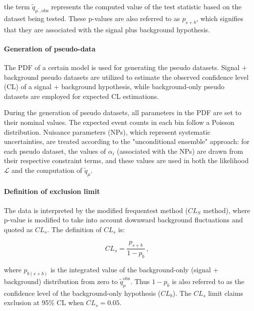 \noindent
the term $\tilde{q}_{\mu^\prime,\mathrm{obs}}$ represents the computed value of the test statistic based on the dataset being tested. These p-values are also referred to as $p_{s+b}$, which signifies that they are associated with the signal plus background hypothesis.

\paragraph{Generation of pseudo-data}\mbox{}\par

The PDF of a certain model is used for generating the pseudo datasets. Signal + background pseudo datasets are utilized to estimate the observed confidence level (CL) of a signal + background hypothesis, while background-only pseudo datasets are employed for expected CL estimations.

During the generation of pseudo datasets, all parameters in the PDF are set to their nominal values. The expected event counts in each bin follow a Poisson distribution. Nuisance parameters (NPs), which represent systematic uncertainties, are treated according to the "unconditional ensemble" approach: for each pseudo dataset, the values of $\alpha_i$ (associated with the NPs) are drawn from their respective constraint terms, and these values are used in both the likelihood $\mathcal{L}$ and the computation of $\tilde{q}_\mu$.




\paragraph{Definition of exclusion limit}\mbox{}\par

The data is interpreted by the modified frequentest method ($CL_S$ method), where p-value is modified to take into account
downward background fluctuations and quoted as
$CL_s$. The definition of $CL_s$ is:


\begin{equation}
CL_s = \frac{p_{s+b}}{1-p_b}\, ,
\end{equation}

\noindent
where $p_{b(s+b)}$ is the integrated value of the background-only (signal + background) distribution
from zero to $\tilde{q}_\mu^\mathrm{obs}$.
Thus $1 - p_b$ is also referred to as the confidence level of the
background-only hypothesis ($CL_b$). The $CL_s$ limit claims exclusion at 95\% CL when $CL_s = 0.05$.
